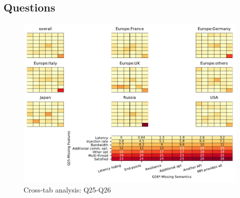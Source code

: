 
\subsection{Questions}


\begin{figure}
\begin{center}
\includegraphics[width=12cm]{../pdfs/Q25-Q26.pdf}
\caption{Cross-tab analysis: Q25-Q26}
\label{fig:Q25-Q26}
\end{center}
\end{figure}
